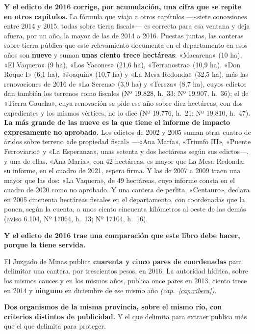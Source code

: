 \textbf{Y el edicto de 2016 corrige, por acumulación, una cifra que se repite en otros capítulos.} La fórmula que viaja a otros capítulos ---«siete concesiones entre 2014 y 2015, todas sobre tierra fiscal»--- es correcta para esa ventana y deja afuera, por un año, la mayor de las de 2014 a 2016. Puestas juntas, las canteras sobre tierra pública que este relevamiento documenta en el departamento en esos años son \textbf{nueve} y suman \textbf{unas ciento trece hectáreas}: «Macarena» (10 ha), «El Vaquero» (9 ha), «Los Yacones» (21,6 ha), «Terranostra» (10,9 ha), «Don Roque I» (6,1 ha), «Joaquín» (10,7 ha) y «La Mesa Redonda» (32,5 ha), más las renovaciones de 2016 de «La Serena» (3,9 ha) y «Tereza» (8,7 ha), cuyos edictos dan también los terrenos como fiscales (Nº 19.828, h.\ 33; Nº 19.907, h.\ 36); el de «Tierra Gaucha», cuya renovación se pide ese año sobre diez hectáreas, con dos expedientes y los mismos vértices, no lo dice (Nº 19.776, h.\ 21; Nº 19.810, h.\ 47). \textbf{La más grande de las nueve es la que tiene el informe de impacto expresamente no aprobado.} Los edictos de 2002 y 2005 suman otras cuatro de áridos sobre terreno «de propiedad fiscal» ---«Ana María», «Triunfo III», «Puente Ferroviario» y «La Esperanza», unas setenta y dos hectáreas según sus edictos---, y una de ellas, «Ana María», con 42 hectáreas, es mayor que La Mesa Redonda; su informe, en el cuadro de 2021, espera firma. Y las de 2007 a 2009 traen una mayor que las dos: «La Vaquera», de 49 hectáreas, cuyo informe consta en el cuadro de 2020 como no aprobado. Y una cantera de perlita, «Centauro», declara en 2005 cincuenta hectáreas fiscales en el departamento, con coordenadas que la ponen, según la cuenta, a unos ciento cincuenta kilómetros al oeste de las demás (aviso 6.104, Nº 17064, h.\ 13; Nº 17104, h.\ 16).

\begin{cautela}
\textbf{Y el edicto de 2016 trae una comparación que este libro debe hacer, porque la tiene servida.}

El Juzgado de Minas publica \textbf{cuarenta y cinco pares de coordenadas} para delimitar una cantera, por trescientos pesos, en 2016. La autoridad hídrica, sobre los mismos cauces y en los mismos años, publica once pares en 2013, ciento trece en 2014 y \textbf{ninguno} en diciembre de ese mismo año \textit{(cap.\ \ref{cap:ribera})}.

\textbf{Dos organismos de la misma provincia, sobre el mismo río, con criterios distintos de publicidad.} Y el que delimita para extraer publica más que el que delimita para proteger.
\end{cautela}

